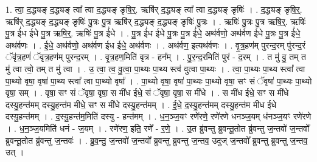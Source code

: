 \documentclass[17pt]{extarticle}
\begin{document}
1. त्वा॒ द॒द्ध्यङ् द॒द्ध्यङ् त्वा᳚ त्वा द॒द्ध्यङ् ङृषि॒र्॒. ऋषि॑र् द॒द्ध्यङ् त्वा᳚ त्वा द॒द्ध्यङ् ङृषिः॑ । . द॒द्ध्यङ् ङृषि॒र्॒. ऋषि॑र् द॒द्ध्यङ् द॒द्ध्यङ् ङृषिः॑ पु॒त्रः पु॒त्र ऋषि॑र् द॒द्ध्यङ् द॒द्ध्यङ्
ङृषिः॑ पु॒त्रः । . ऋषिः॑ पु॒त्रः पु॒त्र ऋषि॒र्॒. ऋषिः॑ पु॒त्र ई॑ध ईधे पु॒त्र ऋषि॒र्॒. ऋषिः॑ पु॒त्र ई॑धे । . पु॒त्र ई॑ध ईधे पु॒त्रः पु॒त्र ई॑धे॒ अथ॑र्वणो॒ अथ॑र्वण ईधे पु॒त्रः पु॒त्र ई॑धे॒ अथ॑र्वणः । . ई॒धे॒ अथ॑र्वणो॒ अथ॑र्वण ईध ईधे॒ अथ॑र्वणः । . अथ॑र्वण॒ इत्यथ॑र्वणः । . वृ॒त्र॒हण॑म् पुरन्द॒रम् पु॑रन्द॒रं ॅवृ॑त्र॒हणं॑ ॅवृत्र॒हण॑म् पुरन्द॒रम् । . वृ॒त्र॒हण॒मिति॑ वृत्र - हन᳚म् । . पु॒र॒न्द॒रमिति॑ पुरं - द॒रम् । . त मु॑ वु॒ तम् त मु॑ त्वा त्वो॒ तम् त मु॑ त्वा । . उ॒ त्वा॒ त्व॒ वु॒त्वा॒ पा॒थ्यः पा॒थ्य स्त्व॑ वुत्वा पा॒थ्यः । . त्वा॒ पा॒थ्यः पा॒थ्य स्त्वा᳚ त्वा पा॒थ्यो वृषा॒ वृषा॑ पा॒थ्य स्त्वा᳚ त्वा पा॒थ्यो वृषा᳚ । . पा॒थ्यो वृषा॒ वृषा॑ पा॒थ्यः पा॒थ्यो वृषा॒ सꣳ सं ॅवृषा॑ पा॒थ्यः पा॒थ्यो वृषा॒ सम् । . वृषा॒ सꣳ सं ॅवृषा॒ वृषा॒ स मी॑ध ईधे॒ सं ॅवृषा॒ वृषा॒ स मी॑धे । . स मी॑ध ईधे॒ सꣳ स मी॑धे दस्यु॒हन्त॑मम् दस्यु॒हन्त॑म मीधे॒ सꣳ स मी॑धे दस्यु॒हन्त॑मम् । . ई॒धे॒ द॒स्यु॒हन्त॑मम् दस्यु॒हन्त॑म मीध ईधे दस्यु॒हन्त॑मम् । . द॒स्यु॒हन्त॑म॒मिति॑ दस्यु - हन्त॑मम् । . ध॒न॒ञ्ज॒यꣳ रणे॑रणे॒ रणे॑रणे धनञ्ज॒यम् ध॑नञ्ज॒यꣳ रणे॑रणे । . ध॒न॒ञ्ज॒यमिति॑ धनं - ज॒यम् । . रणे॑रण॒ इति॒ रणे᳚ - र॒णे॒ । . उ॒त ब्रु॑वन्तु ब्रुवन्तू॒तोत ब्रु॑वन्तु ज॒न्तवो॑ ज॒न्तवो᳚ ब्रुवन्तू॒तोत ब्रु॑वन्तु ज॒न्तवः॑ । . ब्रु॒व॒न्तु॒ ज॒न्तवो॑ ज॒न्तवो᳚ ब्रुवन्तु ब्रुवन्तु ज॒न्तव॒ उदुज् ज॒न्तवो᳚ ब्रुवन्तु ब्रुवन्तु ज॒न्तव॒ उत् । \newline
\end{document}
